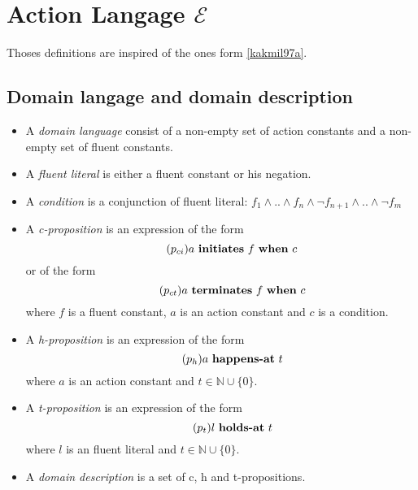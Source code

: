 \section{Action Langage $\mathcal{E}$}\label{sec:e}

Thoses definitions are inspired of the ones form \ref{kakmil97a}.

\theoremstyle{definition}
\newtheorem{definition}{Definition}[section]

\subsection{Domain langage and domain description}

\begin{itemize}
  \item A \emph{domain language} consist of a non-empty set of action constants and a non-empty set of fluent constants.
  \item A \emph{fluent literal} is either a fluent constant or his negation.
  \item A \emph{condition} is a conjunction of fluent literal: $f_1\land .. \land f_n \land \neg f_{n+1} \land .. \land \neg f_m$
  \item A \emph{c-proposition} is an expression of the form
    \begin{equation}\label{c1}\tag{$p_{ci}$}
    	a \text{ \textbf{initiates} } f \text{ \textbf{when} } c
    \end{equation}
    or of the form
    \begin{equation}\label{c2}\tag{$p_{ct}$}
    	a \text{ \textbf{terminates} } f \text{ \textbf{when} } c
    \end{equation}
    where $f$ is a fluent constant, $a$ is an action constant and $c$ is a condition.
  \item A \emph{h-proposition} is an expression of the form
    \begin{equation}\label{h}\tag{$p_h$}
      a \text{ \textbf{happens-at} } t
    \end{equation}
    where $a$ is an action constant and $t \in \mathbb{N} \cup \{0\}$.
  \item A \emph{t-proposition} is an expression of the form
    \begin{equation}\label{t}\tag{$p_t$}
      l \text{ \textbf{holds-at} } t
    \end{equation}
    where $l$ is an fluent literal and $t \in \mathbb{N} \cup \{0\}$.
  \item A \emph{domain description} is a set of c, h and t-propositions.
\end{itemize}

